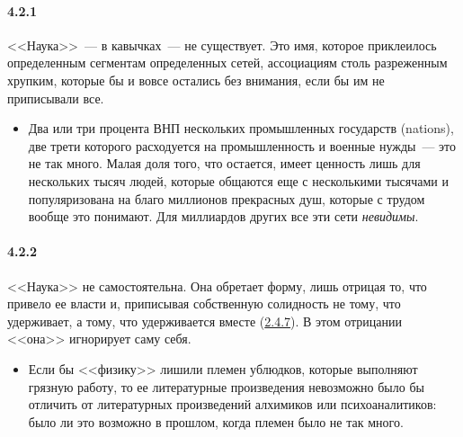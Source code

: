 \paragraph{4.2.1}\hypertarget{par:4.2.1}{} <<Наука>>~--- в кавычках~--- не существует. Это имя, которое приклеилось определенным сегментам определенных сетей, ассоциациям столь разреженным хрупким, которые бы и вовсе остались без внимания, если бы им не приписывали все. 
	\begin{itemize}
	\item 
	Два или три процента ВНП нескольких промышленных государств (nations), две трети которого расходуется на промышленность и военные нужды~--- это не так много. Малая доля того, что остается, имеет ценность лишь для нескольких тысяч людей, которые общаются еще с несколькими тысячами и популяризована на благо миллионов прекрасных душ, которые с трудом вообще это понимают. Для миллиардов других все эти сети {\itshape невидимы}.
	\end{itemize}	

\paragraph{4.2.2}\hypertarget{par:4.2.2}{} <<Наука>> не самостоятельна. Она обретает форму, лишь отрицая то, что привело ее власти и, приписывая собственную солидность не тому, что удерживает, а тому, что удерживается вместе (\hyperlink{par:2.4.7}{2.4.7}). В этом отрицании <<она>> игнорирует саму себя.
	\begin{itemize}
	\item 
	Если бы <<физику>> лишили племен ублюдков, которые выполняют грязную работу, то ее литературные произведения невозможно было бы отличить от литературных произведений алхимиков или психоаналитиков: было ли это возможно в прошлом, когда племен было не так много.
	\end{itemize}	


